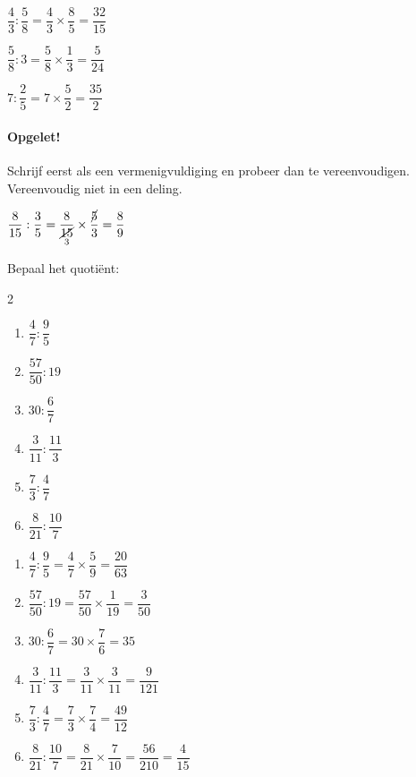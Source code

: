 \documentclass{bis}
\begin{document}
\begin{voorbeeld}
$\dfrac{4}{3}:\dfrac{5}{8}=\dfrac{4}{3}\times\dfrac{8}{5}=\dfrac{32}{15}$
\end{voorbeeld}

\begin{voorbeeld}
$\dfrac{5}{8}:3=\dfrac{5}{8}\times\dfrac{1}{3}=\dfrac{5}{24}$
\end{voorbeeld}

\begin{voorbeeld}
$7:\dfrac{2}{5}=7\times\dfrac{5}{2}=\dfrac{35}{2}$
\end{voorbeeld}

\paragraph*{Opgelet!} Schrijf eerst als een vermenigvuldiging en probeer dan te vereenvoudigen. Vereenvoudig niet in een deling.

\begin{voorbeeld}
$\dfrac{8}{15}:\dfrac{3}{5}=\dfrac{8}{\underset{3}{\cancel{15}}}\times\dfrac{\cancel{5}}{3}=\dfrac{8}{9}$
\end{voorbeeld}

\begin{exercise}
Bepaal het quotiënt:
\begin{multicols}{2}
  \begin{enumerate}
    \item $\dfrac{4}{7}:\dfrac{9}{5}$
    \item $\dfrac{57}{50}:19$
    \item $30:\dfrac{6}{7}$
    \item $\dfrac{3}{11}:\dfrac{11}{3}$
    \item $\dfrac{7}{3}:\dfrac{4}{7}$
    \item $\dfrac{8}{21}:\dfrac{10}{7}$
  \end{enumerate}
\end{multicols}
\end{exercise}

\begin{solution}
  \begin{enumerate}
    \item $\dfrac{4}{7}:\dfrac{9}{5}=\dfrac{4}{7}\times\dfrac{5}{9}=\dfrac{20}{63}$
    \item $\dfrac{57}{50}:19=\dfrac{57}{50}\times\dfrac{1}{19}=\dfrac{3}{50}$
    \item $30:\dfrac{6}{7}=30\times\dfrac{7}{6}=35$
    \item $\dfrac{3}{11}:\dfrac{11}{3}=\dfrac{3}{11}\times\dfrac{3}{11}=\dfrac{9}{121}$
    \item $\dfrac{7}{3}:\dfrac{4}{7}=\dfrac{7}{3}\times\dfrac{7}{4}=\dfrac{49}{12}$
    \item $\dfrac{8}{21}:\dfrac{10}{7}=\dfrac{8}{21}\times\dfrac{7}{10}=\dfrac{56}{210}=\dfrac{4}{15}$
  \end{enumerate}
\end{solution}
\end{document}

